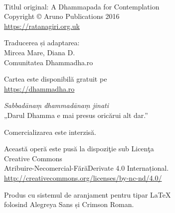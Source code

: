 \cleartoverso
\thispagestyle{empty}

{\copyrightsize
\centering
\setlength{\parindent}{0pt}%
\setlength{\parskip}{0.8\baselineskip}%

\thetitle\\
\theauthor

Titlul original: A Dhammapada for Contemplation\\
Copyright © Aruno Publications 2016\\
\href{https://ratanagiri.org.uk}{https://ratanagiri.org.uk}

Traducerea și adaptarea:\\
Mircea Mare, Diana D.\\
Comunitatea Dhammadha.ro

Cartea este disponibilă gratuit pe\\
\href{https://dhammadha.ro}{https://dhammadha.ro}


\theEditionInfo

\vfill

\emph{Sabbadānaṃ dhammadānaṃ jinati}\\
„Darul Dhamma e mai presus oricărui alt dar.”

Comercializarea este interzisă.

Această operă este pusă la dispoziţie sub Licenţa\\
Creative Commons\\
Atribuire-Necomercial-FărăDerivate 4.0 Internațional.\\
\href{http://creativecommons.org/licenses/by-nc-nd/4.0/}{http://creativecommons.org/licenses/by-nc-nd/4.0/}

Produs cu sistemul de aranjament pentru tipar \LaTeX\,\\
folosind Alegreya Sans și Crimson Roman.

}
